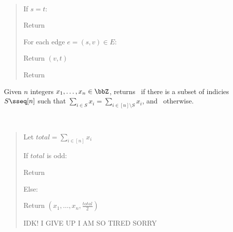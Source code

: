 \documentclass[10pt]{article}
\begin{document}
\begin{solution}\ %
\begin{quote}%
\noindent{}%

%

\begin{steps}
  \item If $s = t$:
    \begin{steps}
    \item Return \boolT~
    \end{steps}
  \end{steps}
  \begin{steps}
  \setcounter{stepsi}{1}
  \item For each edge $e = (s, v) \in E$:
    \begin{steps}
    \item Return $(v, t)$
    \end{steps}
  \item Return \boolF~
\end{steps}

\end{quote}%
\end{solution}%
\pagebreak

Given $ n $ integers $ x_1,\ldots,x_n\in\bbZ $, returns \boolT~if there is a subset of indicies $ S\sseq [n] $ such that $ \sum_{i\in S}x_i = \sum_{i\in[n]\setminus S} x_i $, and \boolF~otherwise.

\begin{solution}\ %
\begin{quote}%
\noindent{}%

%

\begin{steps}
  \item Let $ total = \sum_{i\in [n]} x_i $
  \item If $ total $ is odd:
    \begin{steps}
    \item Return \boolF
    \end{steps}
  \item Else: 
    \begin{steps}
    \item Return $(x_1,\ldots,x_n, \frac{total}{2})$
    \end{steps}

  \item IDK! I GIVE UP I AM SO TIRED SORRY
\end{steps}

\end{quote}%
\end{solution}%
\end{document}
